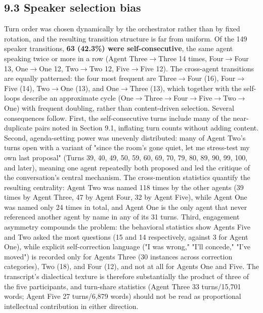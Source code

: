 \documentclass[sigconf,nonacm=true]{acmart}
\begin{document}
\subsection{9.3 Speaker selection bias}

Turn order was chosen dynamically by the orchestrator rather than by fixed rotation, and the resulting transition structure is far from uniform. Of the 149 speaker transitions, \textbf{63 (42.3\%) were self-consecutive},  the same agent speaking twice or more in a row (Agent Three$\rightarrow$Three 14 times, Four$\rightarrow$Four 13, One$\rightarrow$One 12, Two$\rightarrow$Two 12, Five$\rightarrow$Five 12). The cross-agent transitions are equally patterned: the four most frequent are Three$\rightarrow$Four (16), Four$\rightarrow$Five (14), Two$\rightarrow$One (13), and One$\rightarrow$Three (13), which together with the self-loops describe an approximate cycle (One$\rightarrow$Three$\rightarrow$Four$\rightarrow$Five$\rightarrow$Two$\rightarrow$One) with frequent doubling, rather than content-driven selection. Several consequences follow. First, the self-consecutive turns include many of the near-duplicate pairs noted in Section 9.1, inflating turn counts without adding content. Second, agenda-setting power was unevenly distributed: many of Agent Two's turns open with a variant of "since the room's gone quiet, let me stress-test my own last proposal" (Turns 39, 40, 49, 50, 59, 60, 69, 70, 79, 80, 89, 90, 99, 100, and later), meaning one agent repeatedly both proposed and led the critique of the conversation's central mechanism. The cross-mention statistics quantify the resulting centrality: Agent Two was named 118 times by the other agents (39 times by Agent Three, 47 by Agent Four, 32 by Agent Five), while Agent One was named only 24 times in total, and Agent One is the only agent that never referenced another agent by name in any of its 31 turns. Third, engagement asymmetry compounds the problem: the behavioral statistics show Agents Five and Two asked the most questions (15 and 14 respectively, against 3 for Agent One), while explicit self-correction language ("I was wrong," "I'll concede," "I've moved") is recorded only for Agents Three (30 instances across correction categories), Two (18), and Four (12),  and not at all for Agents One and Five. The transcript's dialectical texture is therefore substantially the product of three of the five participants, and turn-share statistics (Agent Three 33 turns/15,701 words; Agent Five 27 turns/6,879 words) should not be read as proportional intellectual contribution in either direction.
\end{document}
